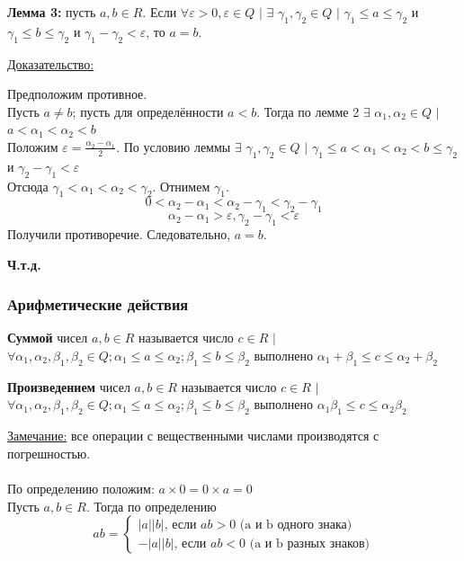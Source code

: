 \documentclass[12pt]{article}
\begin{document}
    \noindent \textbf{Лемма 3:} пусть $a,b \in R$. Если $\forall \varepsilon > 0, \varepsilon \in Q$ $|$ $\exists$ $\gamma_{1}, \gamma_{2} \in Q$ $|$ $\gamma_{1} \le a \le \gamma_{2}$ и $\gamma_{1} \le b \le \gamma_{2}$ и $\gamma_{1} - \gamma_{2} < \varepsilon$, то $a = b$.\par\noindent
    \underline{Доказательство:} 
    \begin{adjustwidth}{1.5em}{1.5em}
        Предположим противное.\\
        Пусть $a \ne b$; пусть для определённости $a < b$. Тогда по лемме 2 $\exists$ $\alpha_{1}, \alpha_{2} \in Q$ $|$ $a < \alpha_{1} < \alpha_{2} < b$\\
        Положим $\varepsilon = \frac{\alpha_{2}-\alpha_{1}}{2}$. По условию леммы $\exists$ $\gamma_{1}, \gamma_{2} \in Q$ $|$ $\gamma_{1} \le a < \alpha_{1} < \alpha_{2} < b \le \gamma_{2}$ и $\gamma_{2} - \gamma_{1} < \varepsilon$\\
        Отсюда $\gamma_{1} < \alpha_{1} < \alpha_{2} < \gamma_{2}$. Отнимем $\gamma_{1}$.\\
        \[0 < \alpha_{2} - \alpha_{1} < \alpha_{2}-\gamma_{1} < \gamma_{2}-\gamma_{1}\]
        \[\alpha_{2} - \alpha_{1} > \varepsilon, \gamma_{2} - \gamma_{1} < \varepsilon\]
        Получили противоречие. Следовательно, $a = b$.
        \begin{center}
            \textbf{Ч.т.д.}
        \end{center}
    \end{adjustwidth}

    \subsubsection*{Арифметические действия}
    \noindent \textbf{Суммой} чисел $a,b \in R$ называется число $c \in R$ $|$ $\forall \alpha_{1}, \alpha_{2}, \beta_{1}, \beta_{2} \in Q; \alpha_{1} \le a \le \alpha_{2}; \beta_{1} \le b \le \beta_{2}$ выполнено $\alpha_{1} + \beta_{1} \le c \le \alpha_{2} + \beta_{2}$\par\noindent
    \noindent \textbf{Произведением} чисел $a,b \in R$ называется число $c \in R$ $|$ $\forall \alpha_{1}, \alpha_{2}, \beta_{1}, \beta_{2} \in Q; \alpha_{1} \le a \le \alpha_{2}; \beta_{1} \le b \le \beta_{2}$ выполнено $\alpha_{1}\beta_{1}\le c \le \alpha_{2}\beta_{2}$\par\noindent
    \underline{Замечание:} все операции с вещественными числами производятся с погрешностью.\\\\
    По определению положим: $a \times 0 = 0 \times a = 0$\\
    Пусть $a,b \in R$. Тогда по определению
    \[ab = \begin{cases}
        |a||b|\text{, если }ab > 0\text{ (a и b одного знака)}\\
        -|a||b|\text{, если }ab < 0\text{ (a и b разных знаков)}
    \end{cases}\]
\end{document}
